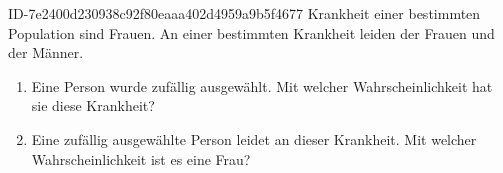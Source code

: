 \begin{exercise}
      {ID-7e2400d230938c92f80eaaa402d4959a9b5f4677}
      {Krankheit}
  \ifproblem\problem
     einer bestimmten Population sind Frauen. An einer bestimmten Krankheit
    leiden  der Frauen und  der Männer.
    \begin{enumerate}
      \item Eine Person wurde zufällig ausgewählt. Mit welcher Wahrscheinlichkeit
            hat sie diese Krankheit?
      \item Eine zufällig ausgewählte Person leidet an dieser Krankheit.
            Mit welcher Wahrscheinlichkeit ist es eine Frau?
    \end{enumerate}
  \fi
\end{exercise}
